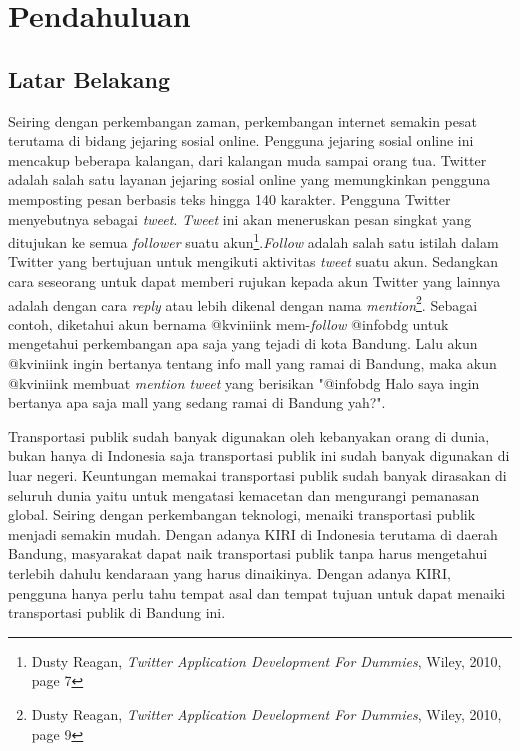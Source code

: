 \chapter{Pendahuluan}
\label{chap:pendahuluan}

\section{Latar Belakang}
\label{sec:latar belakang}

Seiring dengan perkembangan zaman, perkembangan internet semakin pesat terutama di bidang jejaring sosial online. Pengguna jejaring sosial online ini mencakup beberapa kalangan, dari kalangan muda sampai orang tua. Twitter adalah salah satu layanan jejaring sosial online yang memungkinkan pengguna memposting pesan berbasis teks hingga 140 karakter. Pengguna Twitter menyebutnya sebagai \textit{tweet}. \textit{Tweet} ini akan meneruskan pesan singkat yang ditujukan ke semua \textit{follower} suatu akun\footnote{Dusty Reagan, \textit{Twitter Application Development For Dummies}, Wiley, 2010, page 7}.\textit{Follow} adalah salah satu istilah dalam Twitter yang bertujuan untuk mengikuti aktivitas \textit{tweet} suatu akun. Sedangkan cara seseorang untuk dapat memberi rujukan kepada akun Twitter yang lainnya adalah dengan cara \textit{reply} atau lebih dikenal dengan nama \textit{mention}\footnote{Dusty Reagan, \textit{Twitter Application Development For Dummies}, Wiley, 2010, page 9}. Sebagai contoh, diketahui akun bernama @kviniink mem-\textit{follow} @infobdg untuk mengetahui perkembangan apa saja yang tejadi di kota Bandung. Lalu akun @kviniink ingin bertanya tentang info mall yang ramai di Bandung, maka akun @kviniink membuat \textit{mention tweet} yang berisikan "@infobdg Halo saya ingin bertanya apa saja mall yang sedang ramai di Bandung yah?".

Transportasi publik sudah banyak digunakan oleh kebanyakan orang di dunia, bukan hanya di Indonesia saja transportasi publik ini sudah banyak digunakan di luar negeri. Keuntungan memakai transportasi publik sudah banyak dirasakan di seluruh dunia yaitu untuk mengatasi kemacetan dan mengurangi pemanasan global. Seiring dengan perkembangan teknologi, menaiki transportasi publik menjadi semakin mudah. Dengan adanya KIRI di Indonesia terutama di daerah Bandung, masyarakat dapat naik transportasi publik tanpa harus mengetahui terlebih dahulu kendaraan yang harus dinaikinya. Dengan adanya KIRI, pengguna hanya perlu tahu tempat asal dan tempat tujuan untuk dapat menaiki transportasi publik di Bandung ini.

